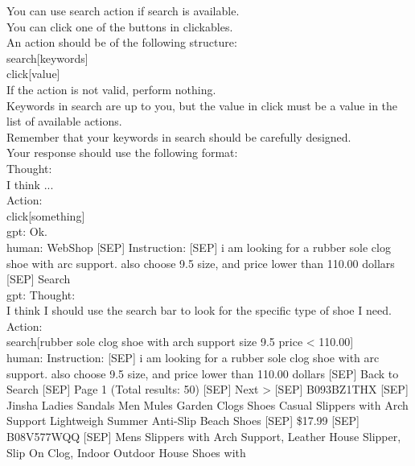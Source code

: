 \documentclass[10pt]{article}
\begin{document}
\begin{Form}
\begin{tcolorbox}[colback=convbg,colframe=itemframe,boxrule=0.8pt,arc=2pt,breakable,left=6pt,right=6pt,top=5pt,bottom=5pt]
{You can use search action if search is available. \\[2pt]
You can click one of the buttons in clickables. \\[2pt]
An action should be of the following structure: \\[2pt]
search[keywords] \\[2pt]
click[value] \\[2pt]
If the action is not valid, perform nothing. \\[2pt]
Keywords in search are up to you, but the value in click must be a value in the list of available actions. \\[2pt]
Remember that your keywords in search should be carefully designed. \\[2pt]
Your response should use the following format: \\[2pt]
Thought: \\[2pt]
I think ... \\[2pt]
Action: \\[2pt]
click[something] \\[2pt]
gpt: Ok. \\[2pt]
human: WebShop [SEP] Instruction: [SEP] i am looking for a rubber sole clog shoe with arc support. also choose 9.5 size, and price lower than 110.00 dollars [SEP] Search \\[2pt]
gpt: Thought: \\[2pt]
I think I should use the search bar to look for the specific type of shoe I need. \\[2pt]
Action: \\[2pt]
search[rubber sole clog shoe with arch support size 9.5 price < 110.00] \\[2pt]
human: Instruction: [SEP] i am looking for a rubber sole clog shoe with arc support. also choose 9.5 size, and price lower than 110.00 dollars [SEP] Back to Search [SEP] Page 1 (Total results: 50) [SEP] Next > [SEP] B093BZ1THX [SEP] Jinsha Ladies Sandals Men Mules Garden Clogs Shoes Casual Slippers with Arch Support Lightweigh Summer Anti-Slip Beach Shoes [SEP] \$17.99 [SEP] B08V577WQQ [SEP] Mens Slippers with Arch Support, Leather House Slipper, Slip On Clog, Indoor Outdoor House Shoes with}
\end{tcolorbox}
\vspace{-1pt}
\CheckBox[name=q38c,width=1.6ex,height=1.6ex,bordercolor={0.45 0.45 0.45}]{~\textcolor{cbox}{COMPACT}}\quad
\CheckBox[name=q38d,width=1.6ex,height=1.6ex,bordercolor={0.45 0.45 0.45}]{~\textcolor{dbox}{DIFFUSE}}\quad
\CheckBox[name=q38n,width=1.6ex,height=1.6ex,bordercolor={0.45 0.45 0.45}]{~\textcolor{nbox}{NONE}}

\end{Form}
\end{document}
